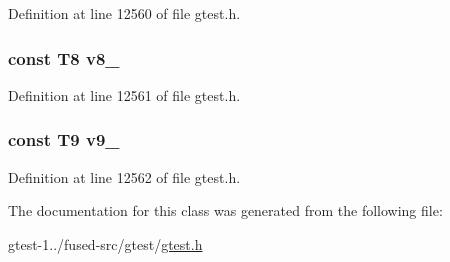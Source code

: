 \-Definition at line 12560 of file gtest.\-h.

\hypertarget{classtesting_1_1internal_1_1ValueArray41_a596bc5260b2474271d1f6910ff6f665d}{
\subsubsection[{v8\-\_\-}]{\setlength{\rightskip}{0pt plus 5cm}const \-T8 {\bf v8\-\_\-}}}\label{d3/de4/classtesting_1_1internal_1_1ValueArray41_a596bc5260b2474271d1f6910ff6f665d}


\-Definition at line 12561 of file gtest.\-h.

\hypertarget{classtesting_1_1internal_1_1ValueArray41_a6356e16cf54a9dfac8525f20242af31e}{
\subsubsection[{v9\-\_\-}]{\setlength{\rightskip}{0pt plus 5cm}const \-T9 {\bf v9\-\_\-}}}\label{d3/de4/classtesting_1_1internal_1_1ValueArray41_a6356e16cf54a9dfac8525f20242af31e}


\-Definition at line 12562 of file gtest.\-h.



\-The documentation for this class was generated from the following file\-:\begin{DoxyCompactItemize}
\item 
gtest-\/1../fused-\/src/gtest/\hyperlink{fused-src_2gtest_2gtest_8h}{gtest.\-h}\end{DoxyCompactItemize}
